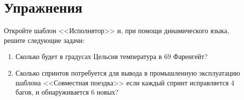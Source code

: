\documentclass[../index.tex]{subfiles}
\begin{document}
	\section{Упражнения}
	
	Откройте шаблон <<Исполнятор>> и, при помощи динамического языка, решите следующие задачи:
	
	\begin{enumerate}
		\item Сколько будет в градусах Цельсия температура в 69 Фаренгейт?
		
		\item Сколько спринтов потребуется для вывода в промышленную эксплуатацию шаблона <<Совместная поездка>> если каждый спринт исправляется 4 багов, и обнаруживается 6 новых?
    \end{enumerate}
\end{document}
